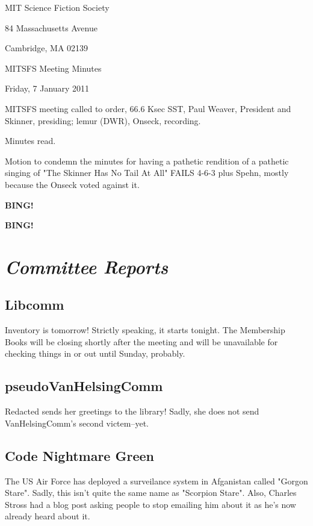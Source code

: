 \documentclass[10pt]{article}
\newcommand{\bing}{{\bf BING!} }
\newcommand{\goto}[1]{\bing \vskip 12pt \section*{{\em{#1}}}}
\newcommand{\ps}{ plus Spehn\xspace}
\newcommand{\skinner}{Paul Weaver, President and Skinner}
\newcommand{\onseck}{lemur (DWR), Onseck}
\newcommand{\meetingdate}{Friday, 7 January 2011}
\begin{document}
\begin{center}

MIT Science Fiction Society

84 Massachusetts Avenue

Cambridge, MA 02139

\vspace{12pt}

MITSFS Meeting Minutes

\meetingdate

\end{center}

\vspace{18pt}

\setlength{\parskip}{6pt}

\noindent
MITSFS meeting called to order, 66.6 Ksec SST,
\skinner, presiding; \onseck, recording.

Minutes read.

Motion to condemn the minutes for having a pathetic rendition of
a pathetic singing of "The Skinner Has No Tail At All" FAILS
4-6-3\ps, mostly because the Onseck voted against it.

\bing

\goto{Committee Reports}

\subsection*{Libcomm}

Inventory is tomorrow!  Strictly speaking, it starts tonight.  The
Membership Books will be closing shortly after the meeting and will
be unavailable for checking things in or out until Sunday, probably.

\subsection*{pseudoVanHelsingComm}

Redacted sends her greetings to the library!  Sadly, she does not send 
VanHelsingComm's second victem--yet.

\subsection*{Code Nightmare Green}

The US Air Force has deployed a surveilance system in Afganistan
called "Gorgon Stare".  Sadly, this isn't quite the same name as
"Scorpion Stare".  Also, Charles Stross had a blog post asking people
to stop emailing him about it as he's now already heard about it.
\end{document}
